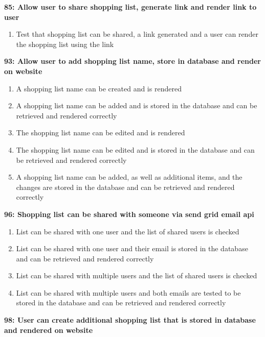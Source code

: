 \documentclass[10pt,onecolumn]{witseiepaper}
\begin{document}
\textbf{85: Allow user to share shopping list, generate link and render link to user}

\begin{enumerate}
	\item Test that shopping list can be shared, a link generated and a user can render the shopping list using the link
\end{enumerate}

\textbf{93: Allow user to add shopping list name, store in database and render on website}

\begin{enumerate}
	\item A shopping list name can be created and is rendered
	\item A shopping list name can be added and is stored in the database and can be retrieved and rendered correctly
	\item The shopping list name can be edited and is rendered
	\item The shopping list name can be edited and is stored in the database and can be retrieved and rendered correctly
	\item  A shopping list name can be added, as well as additional items, and the changes are stored in the database and can be retrieved and rendered correctly
\end{enumerate}

\textbf{96: Shopping list can be shared with someone via send grid email api}
\begin{enumerate}
	\item List can be shared with one user and the list of shared users is checked
	\item List can be shared with one user and their email is stored in the database and can be retrieved and rendered correctly
	\item List can be shared with multiple users and the list of shared users is checked
	\item List can be shared with multiple users and both emails are tested to be stored in the database and can be retrieved and rendered correctly
\end{enumerate}

%

\textbf{98: User can create additional shopping list that is stored in database and rendered on website}
\end{document}
